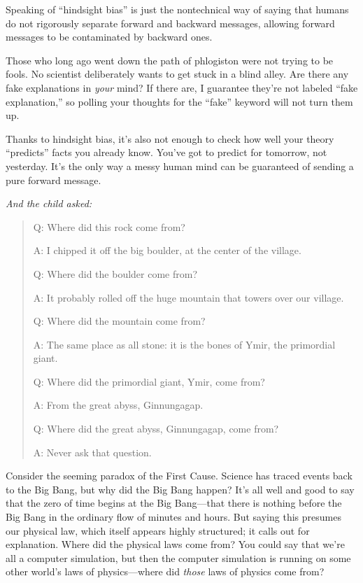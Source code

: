 {
 Speaking of ``hindsight bias''
is just the nontechnical way of saying that humans do not rigorously
separate forward and backward messages, allowing forward messages to be
contaminated by backward ones.}

{
 Those who long ago went down the path of phlogiston were not
trying to be fools. No scientist deliberately wants to get stuck in a
blind alley. Are there any fake explanations in \textit{your} mind? If
there are, I guarantee they're not labeled
``fake explanation,'' so polling
your thoughts for the ``fake''
keyword will not turn them up.}

{
 Thanks to hindsight bias, it's also not enough to
check how well your theory
``predicts'' facts you already know.
You've got to predict for tomorrow, not yesterday.
It's the only way a messy human mind can be guaranteed
of sending a pure forward message.}

\myendsectiontext


\bigskip


{
 \textit{And the child asked:}}

\begin{quote}
{
 Q: Where did this rock come from?}

{
 A: I chipped it off the big boulder, at the center of the
village.}

{
 Q: Where did the boulder come from?}

{
 A: It probably rolled off the huge mountain that towers over our
village.}

{
 Q: Where did the mountain come from?}

{
 A: The same place as all stone: it is the bones of Ymir, the
primordial giant.}

{
 Q: Where did the primordial giant, Ymir, come from?}

{
 A: From the great abyss, Ginnungagap.}

{
 Q: Where did the great abyss, Ginnungagap, come from?}

{
 A: Never ask that question.}
\end{quote}

{
 Consider the seeming paradox of the First Cause. Science has
traced events back to the Big Bang, but why did the Big Bang happen?
It's all well and good to say that the zero of time
begins at the Big Bang---that there is nothing before the Big Bang in
the ordinary flow of minutes and hours. But saying this presumes our
physical law, which itself appears highly structured; it calls out for
explanation. Where did the physical laws come from? You could say that
we're all a computer simulation, but then the computer
simulation is running on some other world's laws of
physics---where did \textit{those} laws of physics come from?}

